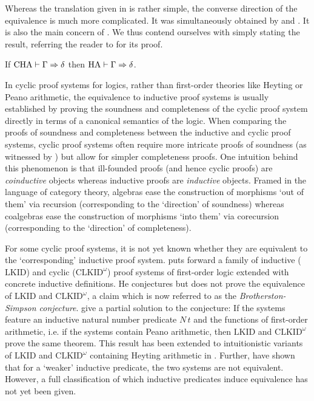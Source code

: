 Whereas the translation given in  is rather simple, the
converse direction of the equivalence is much more complicated. It was
simultaneously obtained by
\textcite{simpsonCyclicArithmeticEquivalent2017} and \textcite{berardiEquivalenceInductiveDefinitions2017}. It is also the main
concern of \TODO{\papTwo{}}. We thus contend ourselves with simply stating the result,
referring the reader to \papTwo{} for its proof.

\begin{fact}\label{lem:cha-into-ha}
  If $\mathrm{CHA} \vdash \Gamma \Rightarrow \delta$ then $\mathrm{HA} \vdash \Gamma \Rightarrow \delta$.
\end{fact}

In cyclic proof systems for logics, rather than first-order theories like Heyting
or Peano arithmetic, the equivalence to inductive proof systems is usually
established by proving the soundness and completeness of the cyclic proof system
directly in terms of a canonical semantics of the logic. When comparing the
proofs of soundness and completeness between the inductive and cyclic proof
systems, cyclic proof systems often require more intricate proofs of
soundness (as witnessed by ) but allow for simpler
completeness proofs. One intuition behind this phenomenon is that ill-founded
proofs (and hence cyclic proofs) are \emph{coinductive} objects whereas
inductive proofs are \emph{inductive} objects. Framed in the language of
category theory, algebras ease
the construction of morphisms `out of them' via recursion
(corresponding to the `direction' of soundness) whereas coalgebras ease the
construction of morphisms `into them' via corecursion (corresponding to the
`direction' of completeness).

For some cyclic proof systems, it is not yet known whether they are equivalent
to the `corresponding' inductive proof system.
\textcite{brotherstonSequentCalculusProof2006} puts forward a family of
inductive ($\mathrm{LKID}$) and cyclic ($\mathrm{CLKID}^\omega$) proof systems
of first-order logic extended with concrete inductive definitions. He
conjectures but does not prove the equivalence of $\mathrm{LKID}$ and
$\mathrm{CLKID}^\omega$, a claim which is now referred to as the
\emph{Brotherston-Simpson conjecture}.
\textcite{berardiEquivalenceInductiveDefinitions2017} give a partial solution to
the conjecture: If the systems feature an inductive natural number predicate
$N\,t$ and the functions of first-order arithmetic, i.e. if the systems contain
Peano arithmetic, then $\mathrm{LKID}$ and $\mathrm{CLKID}^\omega$ prove the
same theorem. This result has been extended to intuitionistic variants of
$\mathrm{LKID}$ and $\mathrm{CLKID}^\omega$ containing Heyting arithmetic in
\parencite{berardiEquivalenceIntuitionisticInductive2017}. Further,
\textcite{tatsutaClassicalSystemMartinLof2019} have shown that for a `weaker'
inductive predicate, the two systems are not equivalent. However, a full
classification of which inductive predicates induce equivalence has not yet been
given.

